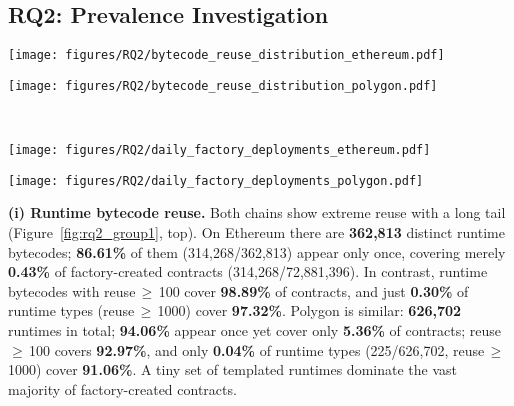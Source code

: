 \documentclass[acmsmall, screen]{acmart}
\begin{document}
	\subsection{RQ2: Prevalence Investigation}

	\begin{figure*}[t]
		\centering
		\begin{minipage}{0.49\textwidth}
			\centering
			\texttt{[image: figures/RQ2/bytecode\_reuse\_distribution\_ethereum.pdf]}
		\end{minipage}\hfill
		\begin{minipage}{0.49\textwidth}
			\centering
			\texttt{[image: figures/RQ2/bytecode\_reuse\_distribution\_polygon.pdf]}
		\end{minipage}
		\\
		\begin{minipage}{0.49\textwidth}
			\centering
			\texttt{[image: figures/RQ2/daily\_factory\_deployments\_ethereum.pdf]}
		\end{minipage}\hfill
		\begin{minipage}{0.49\textwidth}
			\centering
			\texttt{[image: figures/RQ2/daily\_factory\_deployments\_polygon.pdf]}
		\end{minipage}
		\caption{RQ2 (i) and (ii) comparison. Top row: Runtime bytecode reuse distribution (left:
		Ethereum, right: Polygon). X-axis: number of contracts per runtime bytecode (occurrences). Y-axis:
		number of distinct runtime bytecodes with that occurrence count. The overlaid line shows the
		cumulative distribution (CDF). Bottom row: Daily active factories. X-axis: date. Y-axis:
		count of unique factory contracts that executed at least one CREATE/CREATE2 on that day.}
		\label{fig:rq2_group1}
	\end{figure*}

	\textbf{(i) Runtime bytecode reuse.} Both chains show extreme reuse with a long tail (Figure~\ref{fig:rq2_group1},
	top). On Ethereum there are \textbf{362{,}813} distinct runtime bytecodes; \textbf{86.61\%} of them
	(314{,}268/362{,}813) appear only once, covering merely \textbf{0.43\%} of factory-created contracts
	(314{,}268/72{,}881{,}396). In contrast, runtime bytecodes with reuse\,$\ge$\,100 cover \textbf{98.89\%}
	of contracts, and just \textbf{0.30\%} of runtime types (reuse\,$\ge$\,1000) cover \textbf{97.32\%}.
	Polygon is similar: \textbf{626{,}702} runtimes in total; \textbf{94.06\%} appear once yet cover
	only \textbf{5.36\%} of contracts; reuse\,$\ge$\,100 covers \textbf{92.97\%}, and only \textbf{0.04\%}
	of runtime types (225/626{,}702, reuse\,$\ge$\,1000) cover \textbf{91.06\%}. A tiny set of
	templated runtimes dominate the vast majority of factory-created contracts.
\end{document}
